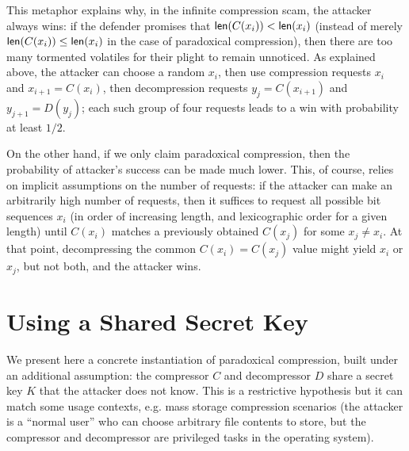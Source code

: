 \documentclass{llncs}
\newcommand{\bitlength}{\text{\textsf{len}}}
\begin{document}
This metaphor explains why, in the infinite compression scam, the
attacker always wins: if the defender promises that $\bitlength(C(x_i))
< \bitlength(x_i)$ (instead of merely $\bitlength(C(x_i)) \leq
\bitlength(x_i)$ in the case of paradoxical compression), then there are
too many tormented volatiles for their plight to remain unnoticed. As
explained above, the attacker can choose a random $x_i$, then use
compression requests $x_i$ and $x_{i+1} = C(x_i)$, then decompression
requests $y_j = C(x_{i+1})$ and $y_{j+1} = D(y_j)$; each such group of
four requests leads to a win with probability at least $1/2$.

On the other hand, if we only claim paradoxical compression, then the
probability of attacker's success can be made much lower. This, of
course, relies on implicit assumptions on the number of requests: if the
attacker can make an arbitrarily high number of requests, then it
suffices to request all possible bit sequences $x_i$ (in order of
increasing length, and lexicographic order for a given length) until
$C(x_i)$ matches a previously obtained $C(x_j)$ for some $x_j \neq x_i$.
At that point, decompressing the common $C(x_i) = C(x_j)$ value might
yield $x_i$ or $x_j$, but not both, and the attacker wins.

\section{Using a Shared Secret Key}\label{sec:withmac}

We present here a concrete instantiation of paradoxical compression,
built under an additional assumption: the compressor $C$ and
decompressor $D$ share a secret key $K$ that the attacker does not know.
This is a restrictive hypothesis but it can match some usage contexts,
e.g. mass storage compression scenarios (the attacker is a ``normal
user'' who can choose arbitrary file contents to store, but the
compressor and decompressor are privileged tasks in the operating
system).
\end{document}
